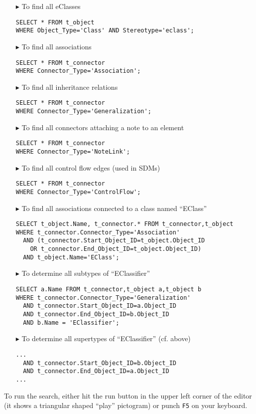 \begin{enumerate}
\item[$\blacktriangleright$]
To find all eClasses
\begin{lstlisting}[frame=single,framerule=0pt]
SELECT * FROM t_object
WHERE Object_Type='Class' AND Stereotype='eclass';
\end{lstlisting}

\item[$\blacktriangleright$]
To find all associations
\begin{lstlisting}[frame=single,framerule=0pt]
SELECT * FROM t_connector
WHERE Connector_Type='Association';
\end{lstlisting}

\item[$\blacktriangleright$]
To find all inheritance relations
\begin{lstlisting}[frame=single,framerule=0pt]
SELECT * FROM t_connector
WHERE Connector_Type='Generalization';
\end{lstlisting}

\item[$\blacktriangleright$]
To find all connectors attaching a note to an element
\begin{lstlisting}[frame=single,framerule=0pt]
SELECT * FROM t_connector
WHERE Connector_Type='NoteLink';
\end{lstlisting}

\item[$\blacktriangleright$]
To find all control flow edges (used in SDMs)
\begin{lstlisting}[frame=single,framerule=0pt]
SELECT * FROM t_connector
WHERE Connector_Type='ControlFlow';
\end{lstlisting}

\item[$\blacktriangleright$]
To find all associations connected to a class named ``EClass''
\begin{lstlisting}[frame=single,framerule=0pt]
SELECT t_object.Name, t_connector.* FROM t_connector,t_object
WHERE t_connector.Connector_Type='Association'
  AND (t_connector.Start_Object_ID=t_object.Object_ID
    OR t_connector.End_Object_ID=t_object.Object_ID)
  AND t_object.Name='EClass';
\end{lstlisting}

\item[$\blacktriangleright$]
To determine all subtypes of ``EClassifier''
\begin{lstlisting}[frame=single,framerule=0pt]
SELECT a.Name FROM t_connector,t_object a,t_object b
WHERE t_connector.Connector_Type='Generalization'
  AND t_connector.Start_Object_ID=a.Object_ID
  AND t_connector.End_Object_ID=b.Object_ID
  AND b.Name = 'EClassifier';
\end{lstlisting}

\item[$\blacktriangleright$]
To determine all supertypes of ``EClassifier'' (cf. above)
\begin{lstlisting}[frame=single,framerule=0pt]
...
  AND t_connector.Start_Object_ID=b.Object_ID
  AND t_connector.End_Object_ID=a.Object_ID
...
\end{lstlisting}
\end{enumerate}

To run the search, either hit the run button in the upper left corner of the editor (it shows a triangular shaped ``play'' pictogram) or punch \texttt{F5} on
your keyboard.

\clearpage